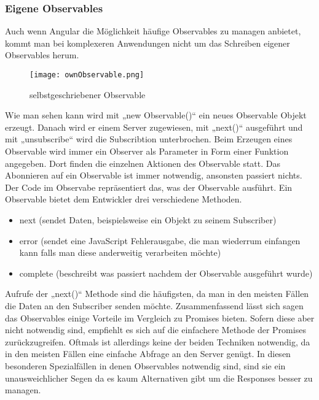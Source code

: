 \subsubsection{Eigene Observables}
Auch wenn Angular die Möglichkeit häufige Observables zu managen anbietet, kommt man bei komplexeren Anwendungen nicht um das Schreiben eigener Observables herum.  
\begin{figure}[H] \centering \texttt{[image: ownObservable.png]} \caption{selbstgeschriebener Observable} \end{figure}
Wie man sehen kann wird mit „new Observable()“ ein neues Observable Objekt erzeugt. Danach wird er einem Server zugewiesen, mit „next()“ ausgeführt und mit „unsubscribe“ wird die Subscribtion unterbrochen. 
Beim Erzeugen eines Observable wird immer ein Observer als Parameter in Form einer Funktion angegeben. Dort finden die einzelnen Aktionen des Observable statt. Das Abonnieren auf ein Observable ist immer notwendig, ansonsten passiert nichts.
Der Code im Observabe repräsentiert das, was der Observable ausführt. Ein Observable bietet dem Entwickler drei verschiedene Methoden.
\begin{itemize}
\item next (sendet Daten, beispielsweise ein Objekt zu seinem Subscriber)
\item error (sendet eine JavaScript Fehlerausgabe, die man wiederrum einfangen kann falls man diese anderweitig verarbeiten möchte)
\item complete (beschreibt was passiert nachdem der Observable ausgeführt wurde)
\end{itemize}
Aufrufe der „next()“ Methode sind die häufigsten, da man in den meisten Fällen die Daten an den Subscriber senden möchte.
Zusammenfassend lässt sich sagen das Observables einige Vorteile im Vergleich zu Promises bieten. Sofern diese aber nicht notwendig sind, empfiehlt es sich auf die einfachere Methode der Promises zurückzugreifen. Oftmals ist allerdings keine der beiden Techniken notwendig, da in den meisten Fällen eine einfache Abfrage an den Server genügt. In diesen besonderen Spezialfällen in denen Observables notwendig sind, sind sie ein unausweichlicher Segen da es kaum Alternativen gibt um die Responses besser zu managen. 





